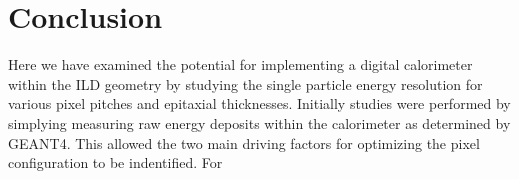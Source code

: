 \section{Conclusion}

Here we have examined the potential for implementing a digital calorimeter within the \ac{ILD} geometry by studying the single particle energy resolution for various pixel pitches and epitaxial thicknesses. Initially studies were performed by simplying measuring raw energy deposits within the calorimeter as determined by GEANT4. This allowed the two main driving factors for optimizing the pixel configuration to be indentified. For 
